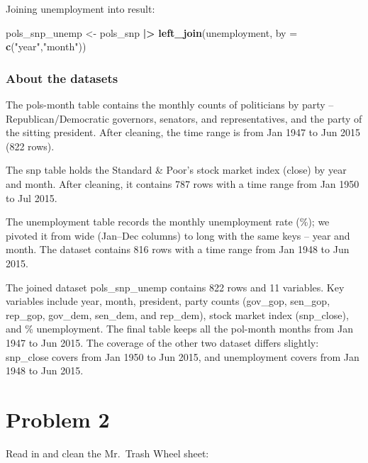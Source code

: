 \documentclass[
]{article}
\newenvironment{Shaded}{\begin{snugshade}}{\end{snugshade}}
\newcommand{\AttributeTok}[1]{\textcolor[rgb]{0.13,0.29,0.53}{#1}}
\newcommand{\FunctionTok}[1]{\textcolor[rgb]{0.13,0.29,0.53}{\textbf{#1}}}
\newcommand{\NormalTok}[1]{#1}
\newcommand{\OtherTok}[1]{\textcolor[rgb]{0.56,0.35,0.01}{#1}}
\newcommand{\SpecialCharTok}[1]{\textcolor[rgb]{0.81,0.36,0.00}{\textbf{#1}}}
\newcommand{\StringTok}[1]{\textcolor[rgb]{0.31,0.60,0.02}{#1}}
\begin{document}
Joining unemployment into result:

\begin{Shaded}
\begin{Highlighting}[]
\NormalTok{pols\_snp\_unemp }\OtherTok{\textless{}{-}}\NormalTok{ pols\_snp }\SpecialCharTok{|\textgreater{}}
  \FunctionTok{left\_join}\NormalTok{(unemployment, }\AttributeTok{by =} \FunctionTok{c}\NormalTok{(}\StringTok{"year"}\NormalTok{,}\StringTok{"month"}\NormalTok{))}
\end{Highlighting}
\end{Shaded}

\subsubsection{About the datasets}\label{about-the-datasets}

The pols-month table contains the monthly counts of politicians by party
-- Republican/Democratic governors, senators, and representatives, and
the party of the sitting president. After cleaning, the time range is
from Jan 1947 to Jun 2015 (822 rows).

The snp table holds the Standard \& Poor's stock market index (close) by
year and month. After cleaning, it contains 787 rows with a time range
from Jan 1950 to Jul 2015.

The unemployment table records the monthly unemployment rate (\%); we
pivoted it from wide (Jan--Dec columns) to long with the same keys --
year and month. The dataset contains 816 rows with a time range from Jan
1948 to Jun 2015.

The joined dataset pols\_snp\_unemp contains 822 rows and 11 variables.
Key variables include year, month, president, party counts (gov\_gop,
sen\_gop, rep\_gop, gov\_dem, sen\_dem, and rep\_dem), stock market
index (snp\_close), and \% unemployment. The final table keeps all the
pol-month months from Jan 1947 to Jun 2015. The coverage of the other
two dataset differs slightly: snp\_close covers from Jan 1950 to Jun
2015, and unemployment covers from Jan 1948 to Jun 2015.

\section{Problem 2}\label{problem-2}

Read in and clean the Mr.~Trash Wheel sheet:
\end{document}
